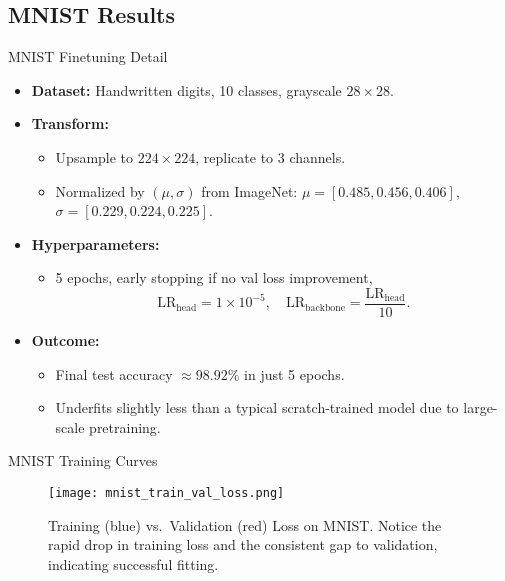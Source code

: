 \documentclass{beamer}
\begin{document}
\subsection{MNIST Results}
\begin{frame}{MNIST Finetuning Detail}
    \begin{itemize}
        \item \textbf{Dataset:} Handwritten digits, 10 classes, grayscale $28\times 28$.
        \item \textbf{Transform:}
              \begin{itemize}
                  \item Upsample to $224\times 224$, replicate to 3 channels.
                  \item Normalized by $(\mu,\sigma)$ from ImageNet: $\mu=[0.485, 0.456, 0.406]$, $\sigma=[0.229, 0.224, 0.225]$.
              \end{itemize}
        \item \textbf{Hyperparameters:}
              \begin{itemize}
                  \item 5 epochs, early stopping if no val loss improvement, 
                  \[
                  \text{LR}_{\text{head}} = 1\times10^{-5}, \quad \text{LR}_{\text{backbone}} = \frac{\text{LR}_{\text{head}}}{10}.
                  \]
              \end{itemize}
        \item \textbf{Outcome:}
              \begin{itemize}
                  \item Final test accuracy $\approx 98.92\%$ in just 5 epochs.
                  \item Underfits slightly less than a typical scratch-trained model due to large-scale pretraining.
              \end{itemize}
    \end{itemize}
\end{frame}

\begin{frame}{MNIST Training Curves}
    \begin{figure}[h]
        \centering
        \texttt{[image: mnist\_train\_val\_loss.png]}
        \caption{Training (blue) vs.\ Validation (red) Loss on MNIST. Notice the rapid drop in training loss and the consistent gap to validation, indicating successful fitting.}
    \end{figure}
\end{frame}
\end{document}
